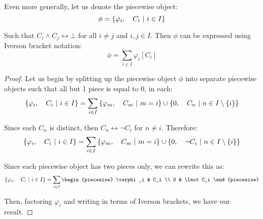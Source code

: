 \begin{theorem}
    \label{theorem:iverson_form}
    Even more generally, let us denote the piecewise object:
    $$
        \phi=\left\{\varphi_i,\quad C_i\ \middle|\ i\in I\right\}
    $$

    Such that $C_i\land C_j\leftrightarrow\bot$ for all $i\neq j$ and $i,j\in I$. Then $\phi$ can be expressed using Iverson bracket notation:
    $$
        \phi=\sum_{i\in I}{\varphi_i[C_i]}
    $$

    \begin{proof}
        Let us begin by splitting up the piecewise object $\phi$ into separate piecewise objects such that all but 1 piece is equal to $0$, in each:
        $$
            \left\{\varphi_i,\quad C_i\ \middle|\ i\in I\right\}=\sum_{i\in I}{\left\{\varphi_m,\quad C_m\ \middle|\ m=i\right\}\cup\left\{0,\quad C_n\ \middle|\ n\in I\setminus\{i\}\right\}}
        $$

        Since each $C_n$ is distinct, then $C_n\leftrightarrow\lnot C_i$ for $n\neq i$. Therefore:
        $$
            \left\{\varphi_i,\quad C_i\ \middle|\ i\in I\right\}=\sum_{i\in I}{\left\{\varphi_m,\quad C_m\ \middle|\ m=i\right\}\cup\left\{0,\quad \lnot C_i\ \middle|\ n\in I\setminus\{i\}\right\}}
        $$

        Since each piecewise object has two pieces only, we can rewrite this as:
        $$
            \pwobj{\varphi_i}{C_i}{i\in I}=\sum_{i\in I}{\begin{piecewise}
                \varphi_i & C_i \\
                0 & \lnot C_i
            \end{piecewise}}
        $$

        Then, factoring $\varphi_i$ and writing in terms of Iverson brackets, we have our result.
    \end{proof}
\end{theorem}
\newpage